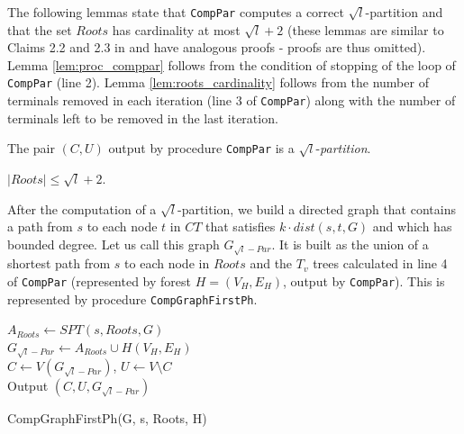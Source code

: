 
The following lemmas state that \verb|CompPar| computes a correct  
\mbox{$\sqrt{l}$-partition} and that the set $Roots$ has cardinality at most $\sqrt{l} + 2$ (these lemmas are
similar to Claims 2.2 and 2.3 in \cite{Elkin2006} and have analogous proofs - proofs are thus omitted). 
Lemma \ref{lem:proc_comppar} follows from the condition of stopping of the loop of \verb|CompPar| (line 2). 
Lemma \ref{lem:roots_cardinality} follows from the number of terminals removed in each iteration (line 3 of \verb|CompPar|) along with the number of terminals left to be removed in 
the last iteration.

\begin{Lem} 
\label{lem:proc_comppar}
\cite{Elkin2006} The pair $(C, U)$ output by procedure \verb|CompPar| is a \mbox{$\sqrt l$-\emph{partition}}. 
\end{Lem}

\begin{Lem} 
\label{lem:roots_cardinality}
\cite{Elkin2006} $|Roots| \le \sqrt{l} + 2$.
\end{Lem}

After the computation of a $\sqrt{l}$-partition, we build a directed graph that contains a path from $s$ to each node $t$ in $CT$ that satisfies $k \cdot dist(s,t,G)$ and
which has bounded degree. Let us call this graph $G_{\sqrt{l}-Par}$. It is built as the union of a shortest path from $s$ to each node in $Roots$ and
the $T_v$ trees calculated in line 4 of \verb|CompPar| (represented by forest $H=(V_H, E_H)$, output by \verb|CompPar|). 
This is represented by procedure \verb|CompGraphFirstPh|. %

\begin{procedure}
$A_{Roots} \gets SPT(s,Roots,G)$\\
$G_{\sqrt{l}-Par} \gets A_{Roots} \cup H(V_H, E_H)$\\
$C \gets V(G_{\sqrt{l}-Par})$, $U \gets V \setminus C$\\
Output $(C,U,G_{\sqrt{l}-Par})$
\caption{CompGraphFirstPh(G, s, Roots, H)} 
\label{alg:compute_arborescence}
\end{procedure}

